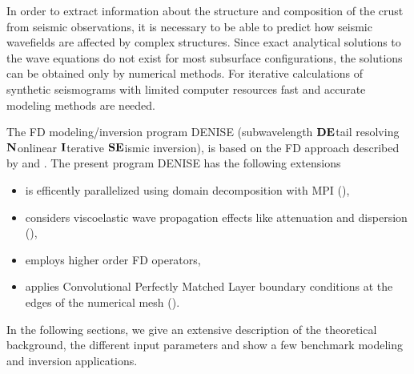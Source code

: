 In order to extract information about the structure and composition of the crust from seismic observations, it is necessary to be able to predict how seismic wavefields are affected by complex structures.
Since exact analytical solutions to the wave equations do not exist for most subsurface configurations, the solutions can be obtained only by numerical methods. For iterative calculations of synthetic seismograms with limited computer resources fast and accurate modeling methods are needed. 

The FD modeling/inversion program DENISE (subwavelength $\bf{DE}$tail resolving $\bf{N}$onlinear $\bf{I}$terative $\bf{SE}$ismic inversion), is based on the FD approach described by \cite{virieux:86} and \cite{levander:88}. The present program DENISE has the following extensions

\begin{itemize}
\item is efficently parallelized using domain decomposition with MPI (\cite{bohlen:02}),
\item considers viscoelastic wave propagation effects like attenuation and dispersion
(\cite{robertsson:94,blanch:95,bohlen:02}),
\item employs higher order FD operators,
\item applies Convolutional Perfectly Matched Layer boundary conditions at the edges of the numerical mesh (\cite{komatitsch:07}).
\end{itemize}

In the following sections, we give an extensive description of the theoretical background, the different input parameters and show a few benchmark modeling and inversion applications.